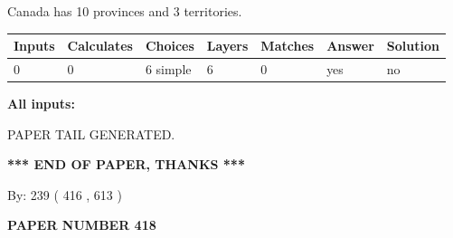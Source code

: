 \documentclass[12pt]{article}
\begin{document}
 
\noindent{}
 
 
Canada has 10  provinces and 3 territories.
 
 
\noindent{}
 
 
   
   
   
   
\noindent\begin{tabular}{|l|l|l|l|l|l|l|}
 \hline
Inputs & Calculates & Choices & Layers & Matches & Answer & Solution \\ \hline
 0  & 
 0  & 
 6
  simple  
  & 
 6  & 
 0  & 
  yes & 
  no 
  \\ \hline
 \end{tabular}
   
   
   
   
\noindent{}
   
   
   
   
\noindent\vspace{0.1in}\hspace{-0.08in} {\textbf{\Large{All inputs: }}}
   
   
   
   
   
   
 \vspace{0.2in}
 
   
   
\vspace{2.0in} PAPER TAIL GENERATED.
   
   
   
   
\vspace{1.0in} 
{\textbf{\large{ *** END OF PAPER, THANKS *** }}} 
   
   
\hspace{1.0in} By: 
 239 ( 416 ,  613 )
   
   
   
   
\newpage 
\setcounter{page}{ 
   418001 } 
   
   
   
   
 {\textbf{ \Large{ PAPER NUMBER  418  }}}
   
   
\vspace{0.2in}
   
   
   
\end{document}
